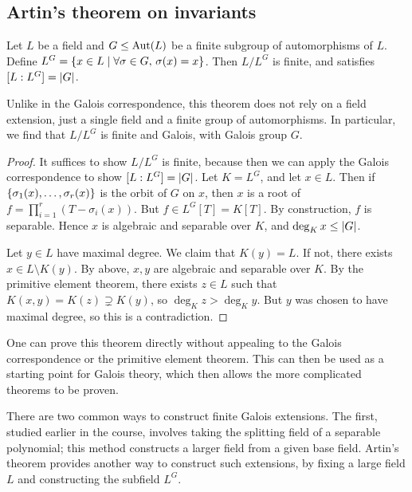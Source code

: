 \subsection{Artin's theorem on invariants}
\begin{theorem}[Artin]
	Let \( L \) be a field and \( G \leq \operatorname{Aut}(L) \) be a finite subgroup of automorphisms of \( L \).
	Define \( L^G = \qty{x \in L \mid \forall \sigma \in G,\, \sigma(x) = x} \).
	Then \( L / L^G \) is finite, and satisfies \( [L:L^G] = \abs{G} \).
\end{theorem}
\begin{remark}
	Unlike in the Galois correspondence, this theorem does not rely on a field extension, just a single field and a finite group of automorphisms.
	In particular, we find that \( L / L^G \) is finite and Galois, with Galois group \( G \).
\end{remark}
\begin{proof}
	It suffices to show \( L/L^G \) is finite, because then we can apply the Galois correspondence to show \( [L:L^G] = \abs{G} \).
	Let \( K = L^G \), and let \( x \in L \).
	Then if \( \qty{\sigma_1(x), \dots, \sigma_r(x)} \) is the orbit of \( G \) on \( x \), then \( x \) is a root of \( f = \prod_{i=1}^r (T - \sigma_i(x)) \).
	But \( f \in L^G[T] = K[T] \).
	By construction, \( f \) is separable.
	Hence \( x \) is algebraic and separable over \( K \), and \( \deg_K x \leq \abs{G} \).

	Let \( y \in L \) have maximal degree.
	We claim that \( K(y) = L \).
	If not, there exists \( x \in L \setminus K(y) \).
	By above, \( x, y \) are algebraic and separable over \( K \).
	By the primitive element theorem, there exists \( z \in L \) such that \( K(x,y) = K(z) \supsetneq K(y) \), so \( \deg_K z > \deg_K y \).
	But \( y \) was chosen to have maximal degree, so this is a contradiction.
\end{proof}
\begin{remark}
	One can prove this theorem directly without appealing to the Galois correspondence or the primitive element theorem.
	This can then be used as a starting point for Galois theory, which then allows the more complicated theorems to be proven.

	There are two common ways to construct finite Galois extensions.
	The first, studied earlier in the course, involves taking the splitting field of a separable polynomial; this method constructs a larger field from a given base field.
	Artin's theorem provides another way to construct such extensions, by fixing a large field \( L \) and constructing the subfield \( L^G \).
\end{remark}
